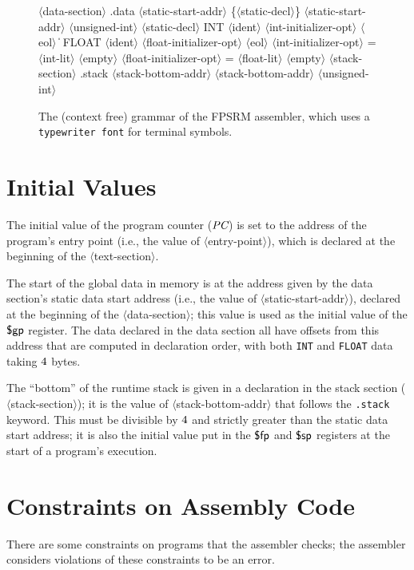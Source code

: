 \documentclass[11pt,letterpaper]{article}
\renewcommand{\nonterm}[1]{\mbox{$\langle$\textrm{#1}$\rangle$}}
\renewcommand{\arbno}[1]{\{#1\}}
\begin{document}
\begin{figure}
\begin{grammar}
\nonterm{data-section} \: .data \nonterm{static-start-addr} \arbno{\nonterm{static-decl}}
\nonterm{static-start-addr} \: \nonterm{unsigned-int}
\nonterm{static-decl} \: INT \nonterm{ident} \nonterm{int-initializer-opt} \nonterm{eol}
\> \| \> FLOAT \nonterm{ident} \nonterm{float-initializer-opt} \nonterm{eol}
\nonterm{int-initializer-opt} \: = \nonterm{int-lit} \| \nonterm{empty}
\nonterm{float-initializer-opt} \: = \nonterm{float-lit} \| \nonterm{empty}
\nonterm{stack-section} \: .stack \nonterm{stack-bottom-addr}
\nonterm{stack-bottom-addr} \: \nonterm{unsigned-int}%
\end{grammar}
\caption{
  The (context free) grammar of the FPSRM assembler, which uses 
  a \texttt{typewriter font} for terminal symbols.
}
\label{fig:cfg}
\end{figure}

\section{Initial Values}
\label{sec:initialvalues}

The initial value of the program counter ($\textit{PC}$) is set to the address of the
program's entry point (i.e., the value of \nonterm{entry-point}), 
which is declared at the beginning of the \nonterm{text-section}.

The start of the global data in memory is at the address given by the
data section's static data start address
(i.e., the value of \nonterm{static-start-addr}), declared at the
beginning of the \nonterm{data-section};
this value is used as the initial value of the $\textsf{\$gp}$ register.
The data declared in the data section all have offsets from this
address that are computed in declaration order, with both
\texttt{INT} and \texttt{FLOAT} data taking $4$ bytes.

The ``bottom'' of the runtime stack is given in a declaration in
the stack section (\nonterm{stack-section});
it is the value of \nonterm{stack-bottom-addr} that follows the
\texttt{.stack} keyword.
This must be divisible by $4$ and strictly greater than the
static data start address; it is also the initial value put in
the $\textsf{\$fp}$ and $\textsf{\$sp}$ registers at the start of a program's execution.

\section{Constraints on Assembly Code}

There are some constraints on programs that the assembler checks;
the assembler considers violations of these constraints to be an error.
\end{document}
